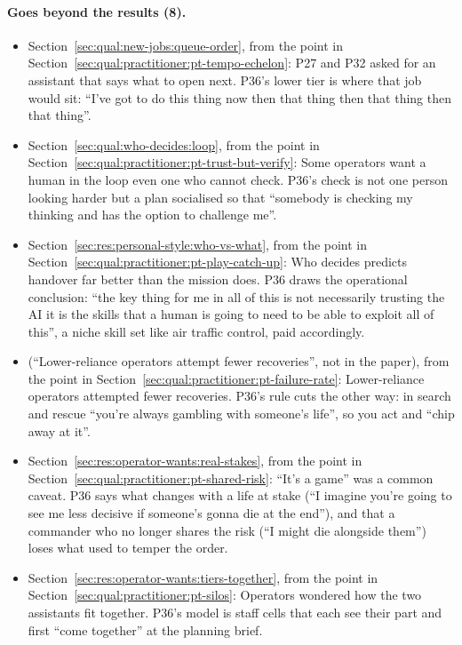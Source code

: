 \paragraph*{Goes beyond the results (8).}
\begin{itemize}[leftmargin=1.2em,itemsep=1pt]\small
\item Section~\ref{sec:qual:new-jobs:queue-order}, from the point in Section~\ref{sec:qual:practitioner:pt-tempo-echelon}: P27 and P32 asked for an assistant that says what to open next. P36's lower tier is where that job would sit: ``I've got to do this thing now then that thing then that thing then that thing''.
\item Section~\ref{sec:qual:who-decides:loop}, from the point in Section~\ref{sec:qual:practitioner:pt-trust-but-verify}: Some operators want a human in the loop even one who cannot check. P36's check is not one person looking harder but a plan socialised so that ``somebody is checking my thinking and has the option to challenge me''.
\item Section~\ref{sec:res:personal-style:who-vs-what}, from the point in Section~\ref{sec:qual:practitioner:pt-play-catch-up}: Who decides predicts handover far better than the mission does. P36 draws the operational conclusion: ``the key thing for me in all of this is not necessarily trusting the AI it is the skills that a human is going to need to be able to exploit all of this'', a niche skill set like air traffic control, paid accordingly.
\item (``Lower-reliance operators attempt fewer recoveries'', not in the paper), from the point in Section~\ref{sec:qual:practitioner:pt-failure-rate}: Lower-reliance operators attempted fewer recoveries. P36's rule cuts the other way: in search and rescue ``you're always gambling with someone's life'', so you act and ``chip away at it''.
\item Section~\ref{sec:res:operator-wants:real-stakes}, from the point in Section~\ref{sec:qual:practitioner:pt-shared-risk}: ``It's a game'' was a common caveat. P36 says what changes with a life at stake (``I imagine you're going to see me less decisive if someone's gonna die at the end''), and that a commander who no longer shares the risk (``I might die alongside them'') loses what used to temper the order.
\item Section~\ref{sec:res:operator-wants:tiers-together}, from the point in Section~\ref{sec:qual:practitioner:pt-silos}: Operators wondered how the two assistants fit together. P36's model is staff cells that each see their part and first ``come together'' at the planning brief.

\end{itemize}
